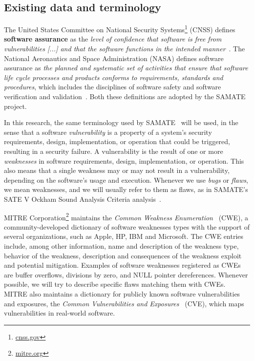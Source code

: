\subsection{Existing data and terminology}

The United States Committee on National Security
Systems\footnote{\url{cnss.gov}} (CNSS) defines \textbf{software assurance} as
the \textit{level of confidence that software is free from vulnerabilities [...]
and that the software functions in the intended
manner}~\cite{instruction20034009}. The National Aeronautics and Space
Administration (NASA) defines software assurance as \textit{the planned and
systematic set of activities that ensure that software life cycle processes and
products conforms to requirements, standards and procedures}, which includes
the disciplines of software safety and software verification and
validation~\cite{nasastd8739}. Both these definitions are adopted by the SAMATE
project.

In this research, the same terminology used by
SAMATE~\cite{black_counting_2011} will be used, in the sense that a software
\textit{vulnerability} is a property of a system's security requirements,
design, implementation, or operation that could be triggered, resulting in a
security failure. A vulnerability is the result of one or more
\textit{weaknesses} in software requirements, design, implementation, or
operation. This also means that a single weakness may or may not result in a
vulnerability, depending on the software's usage and execution. Whenever we use
\textit{bugs} or \textit{flaws}, we mean weaknesses, and we will usually refer
to them as flaws, as in SAMATE's SATE V Ockham Sound Analysis Criteria
analysis~\cite{black_sate_2016}.

MITRE Corporation\footnote{\url{mitre.org}} maintains the \textit{Common Weakness
Enumeration}~\cite{cwe_page} (CWE), a community-developed dictionary of
software weaknesses types with the support of several organizations, such as Apple,
HP, IBM and Microsoft. The CWE entries include, among other information, name
and description of the weakness type, behavior of the weakness, description and
consequences of the weakness exploit and potential mitigation. Examples of
software weaknesses registered as CWEs are buffer overflows, divisions by zero,
and NULL pointer dereferences. Whenever possible, we will try to describe
specific flaws matching them with CWEs. MITRE also maintains a dictionary for
publicly known software vulnerabilities and exposures, the \textit{Common
Vulnerabilities and Exposures}~\cite{cve_page} (CVE), which maps vulnerabilities
in real-world software.

